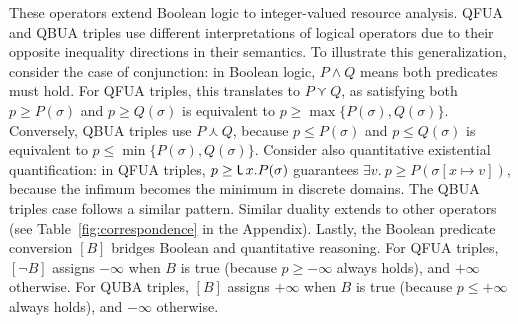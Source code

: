 These operators extend Boolean logic to integer-valued resource analysis. QFUA and QBUA triples use different interpretations of logical operators due to their opposite inequality directions in their semantics.
To illustrate this generalization, consider the case of conjunction: in Boolean logic, $P \land Q$ means both predicates must hold. For QFUA triples, this translates to $P \curlyvee Q$, as satisfying both $p \geq P(\sigma)$ and $p \geq Q(\sigma)$ is equivalent to $p \geq \max\{P(\sigma), Q(\sigma)\}$. Conversely, QBUA triples use $P \curlywedge Q$, because $p \leq P(\sigma)$ and $p \leq Q(\sigma)$ is equivalent to $p \leq \min\{P(\sigma), Q(\sigma)\}$. 
Consider also quantitative existential quantification: in QFUA triples, $p \geq \Inf x.P(\sigma)$ guarantees $\exists v.\ p \geq P(\sigma[x \mapsto v])$, because the infimum becomes the minimum in discrete domains. The QBUA triples case follows a similar pattern.
%
Similar duality extends to other operators (see Table~\ref{fig:correspondence} in the Appendix).
Lastly, the Boolean predicate conversion $[B]$ bridges Boolean and quantitative reasoning. For QFUA triples, $[\neg B]$ assigns $-\infty$ when $B$ is true (because $p \geq -\infty$ always holds), and $+\infty$ otherwise. For QUBA triples, $[B]$ assigns $+\infty$ when $B$ is true (because $p \leq +\infty$ always holds), and $-\infty$ otherwise.

